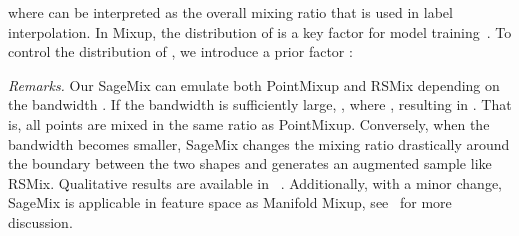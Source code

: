 \documentclass{article}
\begin{document}
where  can be interpreted as the overall mixing ratio that is used in label interpolation. 
In Mixup, the distribution of  is a key factor for model training~\cite{DBLP:conf/iclr/ZhangCDL18}.
To control the distribution of , we introduce a prior factor : 



\textit{Remarks.} 
Our SageMix can emulate both PointMixup and RSMix depending on the bandwidth .
If the bandwidth  is sufficiently large, , where , resulting in . That is, all points are mixed in the same ratio as PointMixup. 
Conversely, when the bandwidth becomes smaller, SageMix changes the mixing ratio drastically around the boundary between the two shapes and generates an augmented sample like RSMix. 
Qualitative results are available in ~. Additionally, with a minor change, SageMix is applicable in feature space as Manifold Mixup, see~ for more discussion.
\end{document}
